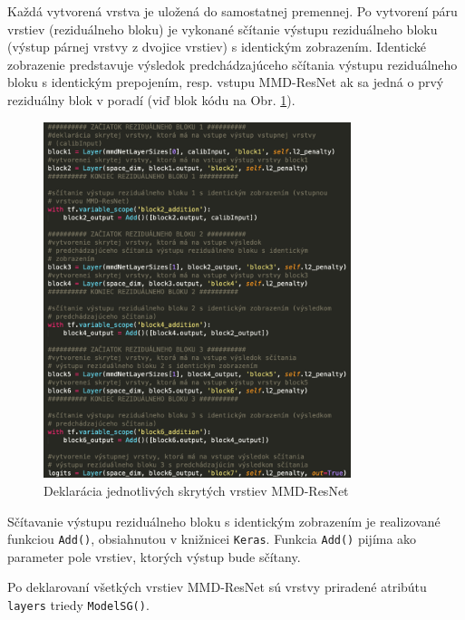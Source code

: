 Každá vytvorená vrstva je uložená do samostatnej premennej. Po vytvorení páru vrstiev (reziduálneho bloku) je vykonané sčítanie výstupu reziduálneho bloku (výstup párnej vrstvy z dvojice vrstiev) s identickým zobrazením. Identické zobrazenie predstavuje výsledok predchádzajúceho sčítania výstupu reziduálneho bloku s identickým prepojením, resp. vstupu MMD-ResNet ak sa jedná o prvý reziduálny blok v poradí (viď blok kódu na Obr. \ref{kod_vrstvy}). 

\begin{figure}
\centerline{\includegraphics[width=0.8\textwidth]{images/kod.png}}
\caption[Deklarácia skrytých vrstiev MMD-ResNet]{Deklarácia jednotlivých skrytých vrstiev MMD-ResNet}
\label{kod_vrstvy}
\end{figure}

Sčítavanie výstupu reziduálneho bloku s identickým zobrazením je realizované funkciou \texttt{Add()}, obsiahnutou v knižnicei \texttt{Keras}. Funkcia \texttt{Add()} pijíma ako parameter pole vrstiev, ktorých výstup bude sčítany.

Po deklarovaní všetkých vrstiev MMD-ResNet sú vrstvy priradené atribútu \texttt{layers} triedy \texttt{ModelSG()}.

